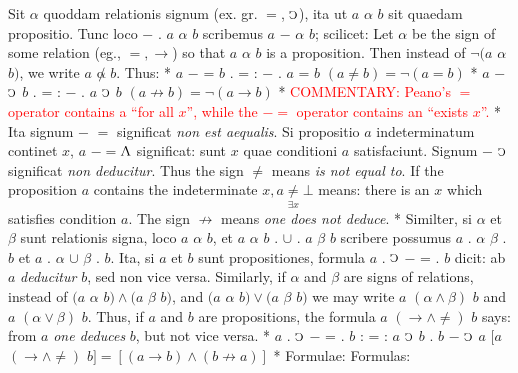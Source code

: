 \documentclass{book}
\newcommand{\C}{\mathop{\sbox0{$\displaystyle$$\reflectbox{C}$} %
\raisebox{-\height+\ht0-0.05cm}[\ht0][\dp0]{\scalebox{0.8}[0.8]{\copy0}}}\displaylimits} %
\newcommand{\abs}{\mathop{\rotatebox[origin=c]{180}{V}}}
\newcommand\commentary[1]{\textcolor{red}{COMMENTARY: #1}}
\newenvironment{translateTwoCol}
               { %
                 \columnratio{0.5, 0.5} \begin{paracol}{2}
                 \newcommand{\LAT}{\switchcolumn[0]*}
                 \newcommand{\ENG}{\switchcolumn[1]}
               }
               { %
                 \let\ENG\undefined
                 \let\LAT\undefined
                 \end{paracol}
               }
\begin{document}
\begin{translateTwoCol}
\quad Sit $\alpha$ quoddam relationis signum (ex. gr. $=$, $\C$), ita ut $a$ $\alpha$ $b$ sit quaedam propositio. Tunc loco $-$ . $a$ $\alpha$ $b$ scribemus $a$ $-$ $\alpha$ $b$; scilicet:
\ENG
\quad Let $\alpha$ be the sign of some relation (eg., $=, \rightarrow$) so that $a$ $\alpha$ $b$ is a proposition. Then instead of $\neg(a$ $\alpha$ $b)$, we write $a$ $\not\alpha$ $b$. Thus:
\LAT
\hspace{1.06cm} $a$ $-$ = $b$ . = : $-$ . $a$ = $b$
\ENG
\hspace{1.06cm} $(a \not= b) = \neg (a=b)$
\LAT
\hspace{1.06cm} $a$ $-$ $\C$ $b$ . = : $-$ . $a$ $\C$ $b$
\ENG
\hspace{1.06cm} $ (a \not\rightarrow b) = \neg (a \rightarrow b)$
\LAT
\ENG
\commentary{Peano's $=$\scalebox{0.7}{$x$} operator contains a ``for all $x$'', while the $-=$\scalebox{0.7}{$x$} operator contains an ``exists $x$''.}
\LAT
\quad Ita signum $-$ $=$ significat {\emph{non est aequalis}}. Si propositio $a$ indeterminatum continet $x$, $a$ $-=$\scalebox{0.7}{$x$}\thinspace $\abs$ significat: sunt $x$ quae conditioni $a$ satisfaciunt. Signum $-$ $\C$ significat {\emph{non deducitur}}.
\ENG
Thus the sign $\not=$ means {\emph{is not equal to}}. If the proposition $a$ contains the indeterminate $x, a\underset{\exists x}\neq \bot$ means: there is an $x$ which satisfies condition $a$. The sign $\not\rightarrow$ means {\emph{one does not deduce}}.
\LAT
\quad Similter, si $\alpha$ et $\beta$ sunt relationis signa, loco $a$ $\alpha$ $b$, et $a$ $\alpha$ $b$ . $\cup$ . $a$ $\beta$ $b$ scribere possumus $a$ . $\alpha$ $\beta$ . $b$ et $a$ . $\alpha$ $\cup$ $\beta$ . $b$. Ita, si $a$ et $b$ sunt propositiones, formula $a$ . $\C$ $-$ = . $b$ dicit: ab $a$ {\emph{deducitur}} $b$, sed non vice versa.
\ENG
\quad Similarly, if $\alpha$ and $\beta$ are signs of relations, instead of $(a$ $\alpha$ $b) \wedge (a$ $\beta$ $b)$, and $(a$ $\alpha$ $b) \vee (a$ $\beta$ $b)$ we may write $a$ $(\alpha \wedge \beta)$ $b$ and $a$ $(\alpha \vee \beta)$ $b$. Thus, if $a$ and $b$ are propositions, the formula $a$ $(\rightarrow \wedge \not=)$ $b$ says: from $a$ {\emph{one deduces}} $b$, but not vice versa.
\LAT
\hspace{1.06cm} $a$ . $\C$ $-$ = . $b$ : = : $a$ $\C$ $b$ . $b$ $-$ $\C$ $a$
\ENG
\hspace{1.06cm} $[a$ $(\rightarrow \wedge \not=)$ $b] = [(a \rightarrow b) \wedge (b \not\rightarrow a)]$
\LAT
\quad Formulae:
\ENG
\quad Formulas:

\end{translateTwoCol}
\end{document}
